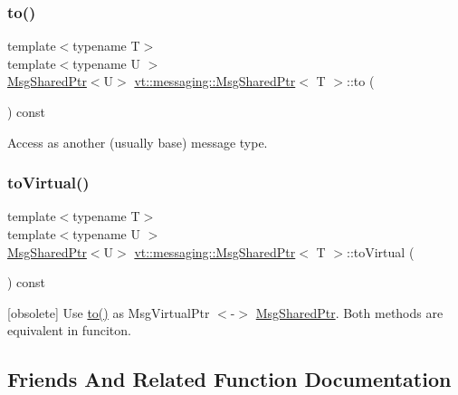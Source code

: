 \subsubsection{\texorpdfstring{to()}{to()}}
{\footnotesize\ttfamily template$<$typename T$>$ \\
template$<$typename U $>$ \\
\hyperlink{structvt_1_1messaging_1_1_msg_shared_ptr}{Msg\+Shared\+Ptr}$<$U$>$ \hyperlink{structvt_1_1messaging_1_1_msg_shared_ptr}{vt\+::messaging\+::\+Msg\+Shared\+Ptr}$<$ T $>$\+::to (\begin{DoxyParamCaption}{ }\end{DoxyParamCaption}) const\hspace{0.3cm}{\ttfamily [inline]}}



Access as another (usually base) message type. 

\mbox{\label{structvt_1_1messaging_1_1_msg_shared_ptr_ab210c87a0489113368209634e76a72b8}} 
\subsubsection{\texorpdfstring{to\+Virtual()}{toVirtual()}}
{\footnotesize\ttfamily template$<$typename T$>$ \\
template$<$typename U $>$ \\
\hyperlink{structvt_1_1messaging_1_1_msg_shared_ptr}{Msg\+Shared\+Ptr}$<$U$>$ \hyperlink{structvt_1_1messaging_1_1_msg_shared_ptr}{vt\+::messaging\+::\+Msg\+Shared\+Ptr}$<$ T $>$\+::to\+Virtual (\begin{DoxyParamCaption}{ }\end{DoxyParamCaption}) const\hspace{0.3cm}{\ttfamily [inline]}}

\mbox{[}obsolete\mbox{]} Use \hyperlink{structvt_1_1messaging_1_1_msg_shared_ptr_ae3d838b37f94f5f63ffc433518d46ada}{to()} as Msg\+Virtual\+Ptr $<$-\/$>$ \hyperlink{structvt_1_1messaging_1_1_msg_shared_ptr}{Msg\+Shared\+Ptr}. Both methods are equivalent in funciton. 

\subsection{Friends And Related Function Documentation}
\mbox{\label{structvt_1_1messaging_1_1_msg_shared_ptr_ac412f09ec806f5915ea4a94f3e84d5f4}} 
